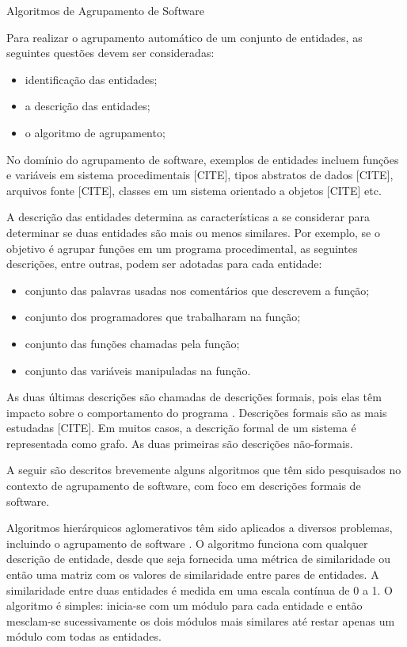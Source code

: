 \begin{section}{Algoritmos de Agrupamento de Software}

Para realizar o agrupamento automático de um conjunto de entidades, as seguintes questões devem ser consideradas:

\begin{itemize}
	\item identificação das entidades;
	\item a descrição das entidades;
	\item o algoritmo de agrupamento;
\end{itemize}

No domínio do agrupamento de software, exemplos de entidades incluem funções e variáveis em sistema procedimentais [CITE], tipos abstratos de dados [CITE], arquivos fonte [CITE], classes em um sistema orientado a objetos [CITE] etc.

A descrição das entidades determina as características a se considerar para determinar se duas entidades são mais ou menos similares. Por exemplo, se o objetivo é agrupar funções em um programa procedimental, as seguintes descrições, entre outras, podem ser adotadas para cada entidade:

\begin{itemize}
	\item conjunto das palavras usadas nos comentários que descrevem a função;
	\item conjunto dos programadores que trabalharam na função;
	\item conjunto das funções chamadas pela função;
	\item conjunto das variáveis manipuladas na função.
\end{itemize}

As duas últimas descrições são chamadas de descrições formais, pois elas têm impacto sobre o comportamento do programa \cite{Anquetil1999}. Descrições formais são as mais estudadas [CITE]. Em muitos casos, a descrição formal de um sistema é representada como grafo. As duas primeiras são descrições não-formais. 

A seguir são descritos brevemente alguns algoritmos que têm sido pesquisados no contexto de agrupamento de software, com foco em descrições formais de software.


Algoritmos hierárquicos aglomerativos têm sido aplicados a diversos problemas, incluindo o agrupamento de software \cite{Anquetil1999,Maqbool2007}. O algoritmo funciona com qualquer descrição de entidade, desde que seja fornecida uma métrica de similaridade ou então uma matriz com os valores de similaridade entre pares de entidades. A similaridade entre duas entidades é medida em uma escala contínua de 0 a 1. O algoritmo é simples: inicia-se com um módulo para cada entidade e então mesclam-se sucessivamente os dois módulos mais similares até restar apenas um módulo com todas as entidades.


\end{section}
